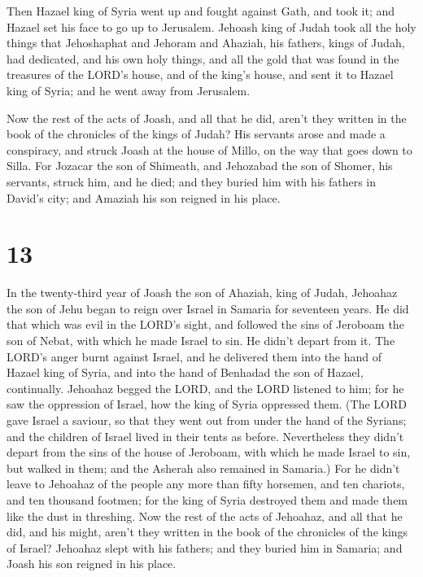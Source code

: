  Then Hazael king of Syria went up and fought against Gath,
and took it; and Hazael set his face to go up to Jerusalem.
 Jehoash king of Judah took all the holy things that
Jehoshaphat and Jehoram and Ahaziah, his fathers, kings of Judah, had
dedicated, and his own holy things, and all the gold that was found in
the treasures of the LORD's house, and of the king's house, and sent it
to Hazael king of Syria; and he went away from Jerusalem.

 Now the rest of the acts of Joash, and all that he did,
aren't they written in the book of the chronicles of the kings of Judah?
 His servants arose and made a conspiracy, and struck Joash
at the house of Millo, on the way that goes down to Silla. 
For Jozacar the son of Shimeath, and Jehozabad the son of Shomer, his
servants, struck him, and he died; and they buried him with his fathers
in David's city; and Amaziah his son reigned in his place.

\hypertarget{section-12}{%
\section{13}\label{section-12}}

 In the twenty-third year of Joash the son of Ahaziah, king
of Judah, Jehoahaz the son of Jehu began to reign over Israel in Samaria
for seventeen years.  He did that which was evil in the
LORD's sight, and followed the sins of Jeroboam the son of Nebat, with
which he made Israel to sin. He didn't depart from it.  The
LORD's anger burnt against Israel, and he delivered them into the hand
of Hazael king of Syria, and into the hand of Benhadad the son of
Hazael, continually.  Jehoahaz begged the LORD, and the LORD
listened to him; for he saw the oppression of Israel, how the king of
Syria oppressed them.  (The LORD gave Israel a saviour, so
that they went out from under the hand of the Syrians; and the children
of Israel lived in their tents as before.  Nevertheless they
didn't depart from the sins of the house of Jeroboam, with which he made
Israel to sin, but walked in them; and the Asherah also remained in
Samaria.)  For he didn't leave to Jehoahaz of the people any
more than fifty horsemen, and ten chariots, and ten thousand footmen;
for the king of Syria destroyed them and made them like the dust in
threshing.  Now the rest of the acts of Jehoahaz, and all
that he did, and his might, aren't they written in the book of the
chronicles of the kings of Israel?  Jehoahaz slept with his
fathers; and they buried him in Samaria; and Joash his son reigned in
his place.


